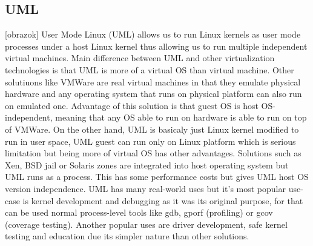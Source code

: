 \begin{enumerate}
\section{UML}
[obrazok] User Mode Linux (UML) allows us to run Linux kernels as user mode processes under a host Linux kernel thus allowing us to run multiple independent virtual machines. Main difference between UML and other virtualization technologies is that UML is more of a virtual OS than virtual machine. Other solutiuons like VMWare are real virtual machines in that they emulate physical hardware and any operating system that runs on physical platform can also run on emulated one. Advantage of this solution is that guest OS is host OS-independent, meaning that any OS able to run on hardware is able to run on top of VMWare. On the other hand, UML is basicaly just Linux kernel modified to run in user space, UML guest can run only on Linux platform which is serious limitation but being more of virtual OS has other advantages. Solutions such as Xen, BSD jail or Solaris zones are integrated into host operating system but UML runs as a process. This has some performance costs but gives UML host OS version independence. UML has many real-world uses but it's most popular use-case is kernel development and debugging as it was its original purpose, for that can be used normal process-level tools like gdb, gporf (profiling) or gcov (coverage testing). Another popular uses are driver development, safe kernel testing and education due its simpler nature than other solutions.



\end{enumerate}
